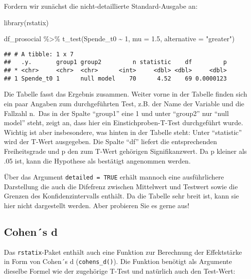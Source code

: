 \documentclass[
]{book}
\newenvironment{Shaded}{\begin{snugshade}}{\end{snugshade}}
\newcommand{\AttributeTok}[1]{\textcolor[rgb]{0.77,0.63,0.00}{#1}}
\newcommand{\DecValTok}[1]{\textcolor[rgb]{0.00,0.00,0.81}{#1}}
\newcommand{\FloatTok}[1]{\textcolor[rgb]{0.00,0.00,0.81}{#1}}
\newcommand{\FunctionTok}[1]{\textcolor[rgb]{0.00,0.00,0.00}{#1}}
\newcommand{\NormalTok}[1]{#1}
\newcommand{\SpecialCharTok}[1]{\textcolor[rgb]{0.00,0.00,0.00}{#1}}
\newcommand{\StringTok}[1]{\textcolor[rgb]{0.31,0.60,0.02}{#1}}
\begin{document}
Fordern wir zunächst die nicht-detaillierte Standard-Ausgabe an:

\begin{Shaded}
\begin{Highlighting}[]
\FunctionTok{library}\NormalTok{(rstatix)}

\NormalTok{df\_prosocial }\SpecialCharTok{\%\textgreater{}\%} 
  \FunctionTok{t\_test}\NormalTok{(Spende\_t0 }\SpecialCharTok{\textasciitilde{}} \DecValTok{1}\NormalTok{, }\AttributeTok{mu =} \FloatTok{1.5}\NormalTok{, }\AttributeTok{alternative =} \StringTok{"greater"}\NormalTok{) }
\end{Highlighting}
\end{Shaded}

\begin{verbatim}
## # A tibble: 1 x 7
##   .y.       group1 group2         n statistic    df         p
## * <chr>     <chr>  <chr>      <int>     <dbl> <dbl>     <dbl>
## 1 Spende_t0 1      null model    70      4.52    69 0.0000123
\end{verbatim}

Die Tabelle fasst das Ergebnis zusammen. Weiter vorne in der Tabelle finden sich ein paar Angaben zum durchgeführten Test, z.B. der Name der Variable und die Fallzahl n.~Das in der Spalte ``group1'' eine 1 und unter ``group2'' nur ``null model'' steht, zeigt an, dass hier ein Einstichproben-T-Test durchgeführt wurde. Wichtig ist aber insbesondere, was hinten in der Tabelle steht: Unter ``statistic'' wird der T-Wert ausgegeben. Die Spalte ``df'' liefert die entsprechenden Freiheitsgrade und p den zum T-Wert gehörigen Signifikanzwert. Da p kleiner als .05 ist, kann die Hypothese als bestätigt angenommen werden.

Über das Argument \texttt{detailed\ =\ TRUE} erhält mannoch eine ausführlichere Darstellung die auch die Difefrenz zwischen Mittelwert und Testwert sowie die Grenzen des Konfidenzintervalls enthält. Da die Tabelle sehr breit ist, kann sie hier nicht dargestellt werden. Aber probieren Sie es gerne aus!

\hypertarget{cohens-d}{%
\subsection{Cohen´s d}\label{cohens-d}}

Das \texttt{rstatix}-Paket enthält auch eine Funktion zur Berechnung der Effektstärke in Form von Cohen´s d (\texttt{cohens\_d()}). Die Funktion benötigt als Argumente dieselbe Formel wie der zugehörige T-Test und natürlich auch den Test-Wert:
\end{document}
